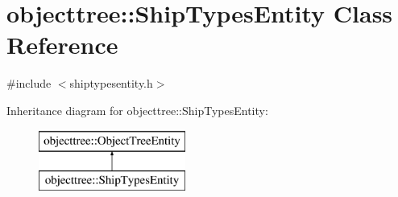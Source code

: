 \hypertarget{classobjecttree_1_1_ship_types_entity}{}\section{objecttree\+::Ship\+Types\+Entity Class Reference}
\label{classobjecttree_1_1_ship_types_entity}


{\ttfamily \#include $<$shiptypesentity.\+h$>$}

Inheritance diagram for objecttree\+::Ship\+Types\+Entity\+:\begin{figure}[H]
\begin{center}
\leavevmode
\includegraphics[height=2.000000cm]{da/d16/classobjecttree_1_1_ship_types_entity}
\end{center}
\end{figure}
